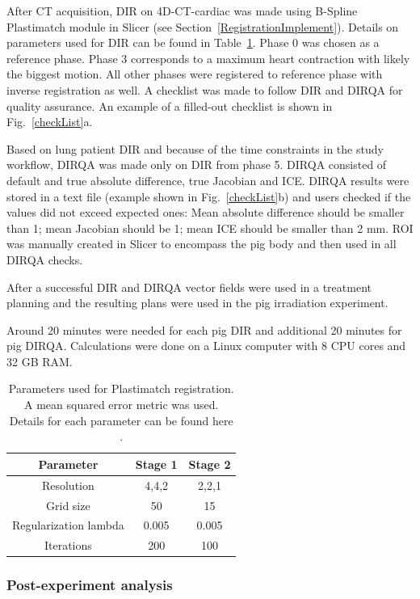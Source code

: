 After CT acquisition, DIR on 4D-CT-cardiac was made using B-Spline Plastimatch module in Slicer (see Section~\ref{RegistrationImplement}). 
Details on parameters used for DIR can be found in Table~\ref{tab:stages2}. Phase 0 was chosen as a reference phase. Phase 3 corresponds to a maximum heart contraction with likely
the biggest motion. All other phases were registered to reference phase with inverse registration as well. 
A checklist was made to follow DIR and DIRQA for quality assurance. An example of a filled-out checklist is shown in Fig.~\ref{checkList}a.

Based on lung patient DIR and because of the time constraints in the study workflow, DIRQA was made only on DIR from phase 5. 
DIRQA consisted of default and true absolute difference, true Jacobian and ICE. DIRQA results were stored in a text file (example shown in Fig.~\ref{checkList}b) and users checked if the values did not exceed expected ones: Mean absolute difference
should be smaller than 1; mean Jacobian  should be 1; mean ICE  should be smaller than 2 mm. ROI was manually created in Slicer to encompass the pig body and then used in all DIRQA checks.

After a successful DIR and DIRQA vector fields were used in a treatment planning and the resulting plans were used in the pig irradiation experiment.

Around 20 minutes were needed for each pig DIR and additional 20 minutes for pig DIRQA. Calculations were done on a Linux computer with 8 CPU cores and 32 GB RAM.

\begin{table}[H]
  \centering
  \caption{Parameters used for Plastimatch registration.  A mean squared error metric was used. Details for each parameter can be found here \cite{Plastimatch}.}
  \begin{tabular}{c|c|c}
      Parameter & Stage 1 & Stage 2 \\
      \hline
      Resolution & 4,4,2 & 2,2,1 \\
      Grid size & 50 & 15 \\
      Regularization lambda & 0.005 & 0.005 \\
      Iterations & 200 & 100 \\
    \hline\hline
  \end{tabular}
  \label{tab:stages2}
\end{table}

\subsubsection{Post-experiment analysis}

